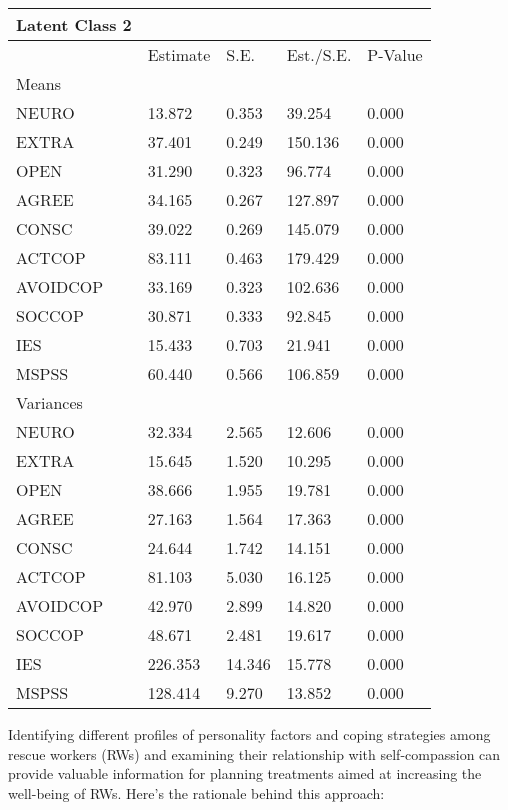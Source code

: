 \documentclass[
  man]{apa7}
\begin{document}
\begin{longtable}[]{@{}lllll@{}}
\toprule\noalign{}
Latent Class 2 & & & & \\
\midrule\noalign{}
\endhead
\bottomrule\noalign{}
\endlastfoot
& Estimate & S.E. & Est./S.E. & P-Value \\
Means & & & & \\
NEURO & 13.872 & 0.353 & 39.254 & 0.000 \\
EXTRA & 37.401 & 0.249 & 150.136 & 0.000 \\
OPEN & 31.290 & 0.323 & 96.774 & 0.000 \\
AGREE & 34.165 & 0.267 & 127.897 & 0.000 \\
CONSC & 39.022 & 0.269 & 145.079 & 0.000 \\
ACTCOP & 83.111 & 0.463 & 179.429 & 0.000 \\
AVOIDCOP & 33.169 & 0.323 & 102.636 & 0.000 \\
SOCCOP & 30.871 & 0.333 & 92.845 & 0.000 \\
IES & 15.433 & 0.703 & 21.941 & 0.000 \\
MSPSS & 60.440 & 0.566 & 106.859 & 0.000 \\
Variances & & & & \\
NEURO & 32.334 & 2.565 & 12.606 & 0.000 \\
EXTRA & 15.645 & 1.520 & 10.295 & 0.000 \\
OPEN & 38.666 & 1.955 & 19.781 & 0.000 \\
AGREE & 27.163 & 1.564 & 17.363 & 0.000 \\
CONSC & 24.644 & 1.742 & 14.151 & 0.000 \\
ACTCOP & 81.103 & 5.030 & 16.125 & 0.000 \\
AVOIDCOP & 42.970 & 2.899 & 14.820 & 0.000 \\
SOCCOP & 48.671 & 2.481 & 19.617 & 0.000 \\
IES & 226.353 & 14.346 & 15.778 & 0.000 \\
MSPSS & 128.414 & 9.270 & 13.852 & 0.000 \\
\end{longtable}

Identifying different profiles of personality factors and coping strategies among rescue workers (RWs) and examining their relationship with self-compassion can provide valuable information for planning treatments aimed at increasing the well-being of RWs. Here's the rationale behind this approach:
\end{document}
